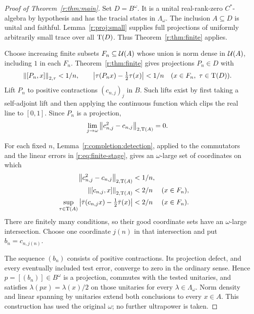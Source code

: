 \begin{proof}[Proof of Theorem~\ref{r:thm:main}]
Set \(D=B^\omega\). It is a unital real-rank-zero \(C^*\)-algebra by
hypothesis and has the tracial states in \(\Lambda_\omega\).
The inclusion \(A\subseteq D\) is unital and faithful.
Lemma~\ref{r:proj:small} supplies full projections of uniformly
arbitrarily small trace over all \(\operatorname T(D)\).
Thus Theorem~\ref{r:thm:finite} applies.

Choose increasing finite subsets \(F_n\subseteq\mathcal U(A)\) whose union is
norm dense in \(\mathcal U(A)\), including \(1\) in each \(F_n\).
Theorem~\ref{r:thm:finite} gives projections \(P_n\in D\) with
\begin{equation}\label{r:eq:finite-stage}
 \left\|[P_n,x]\right\|_{2,\tau}<1/n,\qquad
 \left|\tau(P_nx)-\tfrac12\tau(x)\right|<1/n
 \quad(x\in F_n,\ \tau\in\operatorname T(D)).
\end{equation}
Lift \(P_n\) to positive contractions \((c_{n,j})_j\) in \(B\).
Such lifts exist by first taking a self-adjoint lift and then applying
the continuous function which clips the real line to \([0,1]\).
Since \(P_n\) is a projection,
\[
 \lim_{j\to\omega}\left\|c_{n,j}^2-c_{n,j}\right\|_{2,\operatorname T(A)}=0.
\]

For each fixed \(n\), Lemma~\ref{r:completion:detection}, applied to the
commutators and the linear errors in \eqref{r:eq:finite-stage}, gives
an \(\omega\)-large set of coordinates on which
\begin{align*}
 \left\|c_{n,j}^2-c_{n,j}\right\|_{2,\operatorname T(A)}&<1/n,\\
 \left\|[c_{n,j},x]\right\|_{2,\operatorname T(A)}&<2/n &&(x\in F_n),\\
 \sup_{\tau\in\operatorname T(A)}
 \left|\bar\tau(c_{n,j}x)-\tfrac12\bar\tau(x)\right|
 &<2/n &&(x\in F_n).
\end{align*}
There are finitely many conditions, so their good coordinate sets
have an \(\omega\)-large intersection.
Choose one coordinate \(j(n)\) in that intersection and put
\(b_n=c_{n,j(n)}\).

The sequence \((b_n)\) consists of positive contractions.
Its projection defect, and every eventually included test error,
converge to zero in the ordinary sense. Hence
\(p=[(b_n)]\in B^\omega\) is a projection, commutes with the tested
unitaries, and satisfies
\(\lambda(px)=\lambda(x)/2\) on those unitaries for every
\(\lambda\in\Lambda_\omega\).
Norm density and linear spanning by unitaries extend both conclusions
to every \(x\in A\).
This construction has used the original \(\omega\); no further
ultrapower is taken.


\end{proof}
